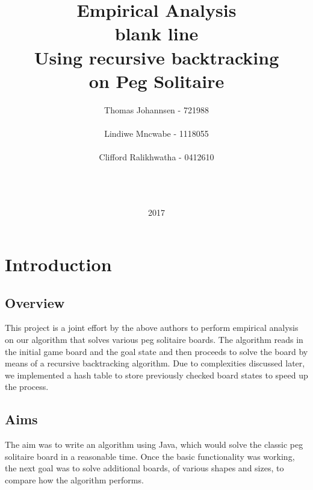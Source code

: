 \documentclass[11pt]{article}
\title{%
\Huge Empirical Analysis\\
\color{white} blank line\\
\color{black}
\Large
Using recursive backtracking\\
on Peg Solitaire}
\date{2017}
\author{Thomas Johannsen - 721988\\\\Lindiwe Mncwabe - 1118055\\\\Clifford Ralikhwatha - 0412610\\\\\\\\}
\begin{document}
\maketitle
{}
\newpage
\tableofcontents
\listoffigures
\newpage
{}
\section{Introduction}
\subsection{Overview}
This project is a joint effort by the above authors to perform empirical analysis on our algorithm that solves various peg solitaire boards. The algorithm reads in the initial game board and the goal state and then proceeds to solve the board by means of a recursive backtracking algorithm. Due to complexities discussed later, we implemented a hash table to store previously checked board states to speed up the process.
\subsection{Aims}
The aim was to write an algorithm using Java, which would solve the classic peg\\ solitaire board in a reasonable time. Once the basic functionality was working, the next goal was to solve additional boards, of various shapes and sizes, to compare how the algorithm performs.\\
\newpage
\end{document}

